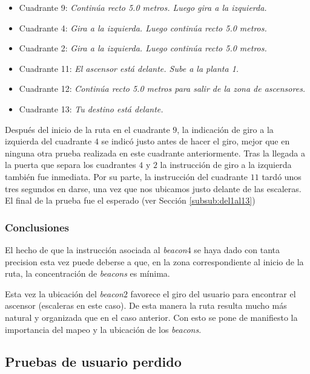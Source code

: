 \begin{itemize}
	\item Cuadrante 9: \textit{Continúa recto 5.0 metros. Luego gira a la izquierda.}
	
	\item Cuadrante 4: \textit{Gira a la izquierda. Luego continúa recto 5.0 metros.}
	
	\item Cuadrante 2: \textit{Gira a la izquierda. Luego continúa recto 5.0 metros.}
	
	\item Cuadrante 11: \textit{El ascensor está delante. Sube a la planta 1.}
	
	\item Cuadrante 12: \textit{Continúa recto 5.0 metros para salir de la zona de ascensores.}
	
	\item Cuadrante 13: \textit{Tu destino está delante.}
\end{itemize}


Después del inicio de la ruta en el cuadrante $9$, la indicación de giro a la izquierda del cuadrante $4$ se indicó justo antes de hacer el giro, mejor que en ninguna otra prueba realizada en este cuadrante anteriormente. Tras la llegada a la puerta que separa los cuadrantes $4$ y $2$ la instrucción de giro a la izquierda también fue inmediata. Por su parte, la instrucción del cuadrante $11$ tardó unos tres segundos en darse, una vez que nos ubicamos justo delante de las escaleras. El final de la prueba fue el esperado (ver Sección \ref{subsub:del1al13})

\subsubsection*{Conclusiones}

El hecho de que la instrucción asociada al \textit{beacon$4$} se haya dado con tanta precision esta vez puede deberse a que, en la zona correspondiente al inicio de la ruta, la concentración de \textit{beacons} es mínima.

Esta vez la ubicación del \textit{beacon$2$} favorece el giro del usuario para encontrar el ascensor (escaleras en este caso). De esta manera la ruta resulta mucho más natural y organizada que en el caso anterior. Con esto se pone de manifiesto la importancia del mapeo y la ubicación de los \textit{beacons}.


\subsection{Pruebas de usuario perdido}
\label{sub:usuarioPerdido}

